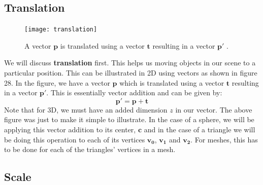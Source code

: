 \documentclass[11pt,a4paper]{article}
\begin{document}
	\subsection{Translation}
	\begin{figure}
		\centering
		\texttt{[image: translation]} 
		\caption{A vector $\boldsymbol{p}$ is translated using a vector $\boldsymbol{t}$ resulting in a vector $\boldsymbol{p'}$ \protect\cite{2dtransformations}.}
		\label{fig:scale}
	\end{figure}
	We will discuss \textbf{translation} first. This helps us moving objects in our scene to a particular position. This can be illustrated in 2D using vectors as shown in figure 28.
	\noindent
	In the figure, we have a vector $\boldsymbol{p}$ which is translated using a vector $\boldsymbol{t}$ resulting in a vector $\boldsymbol{p'}$. This is essentially vector addition and can be given by:
	\begin{equation}
		\boldsymbol{p'} = \boldsymbol{p} + \boldsymbol{t}
	\end{equation}
	Note that for 3D, we must have an added dimension $z$ in our vector. The above figure was just to make it simple to illustrate. In the case of a sphere, we will be applying this vector addition to its center, $\boldsymbol{c}$ and in the case of a triangle we will be doing this operation to each of its vertices $\boldsymbol{v_{0}}$, $\boldsymbol{v_{1}}$ and $\boldsymbol{v_{2}}$. For meshes, this has to be done for each of the triangles' vertices in a mesh. 
	\subsection{Scale}
	
\end{document}
